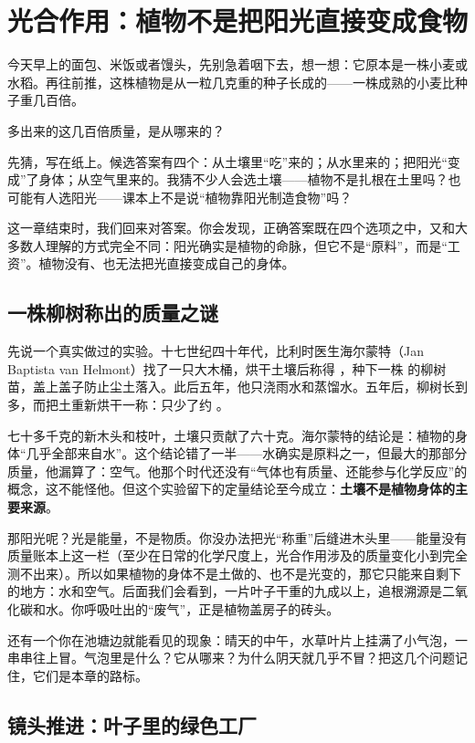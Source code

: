 \chapter{光合作用：植物不是把阳光直接变成食物}

\begin{kaichang}
今天早上的面包、米饭或者馒头，先别急着咽下去，想一想：它原本是一株小麦或水稻。再往前推，这株植物是从一粒几克重的种子长成的——一株成熟的小麦比种子重几百倍。

多出来的这几百倍质量，是从哪来的？

先猜，写在纸上。候选答案有四个：从土壤里“吃”来的；从水里来的；把阳光“变成”了身体；从空气里来的。我猜不少人会选土壤——植物不是扎根在土里吗？也可能有人选阳光——课本上不是说“植物靠阳光制造食物”吗？

这一章结束时，我们回来对答案。你会发现，正确答案既在四个选项之中，又和大多数人理解的方式完全不同：阳光确实是植物的命脉，但它不是“原料”，而是“工资”。植物没有、也无法把光直接变成自己的身体。
\end{kaichang}

\section{一株柳树称出的质量之谜}

先说一个真实做过的实验。十七世纪四十年代，比利时医生海尔蒙特（Jan Baptista van Helmont）找了一只大木桶，烘干土壤后称得 ，种下一株  的柳树苗，盖上盖子防止尘土落入。此后五年，他只浇雨水和蒸馏水。五年后，柳树长到  多，而把土重新烘干一称：只少了约 。

七十多千克的新木头和枝叶，土壤只贡献了六十克。海尔蒙特的结论是：植物的身体“几乎全部来自水”。这个结论错了一半——水确实是原料之一，但最大的那部分质量，他漏算了：空气。他那个时代还没有“气体也有质量、还能参与化学反应”的概念，这不能怪他。但这个实验留下的定量结论至今成立：\textbf{土壤不是植物身体的主要来源}。

那阳光呢？光是能量，不是物质。你没办法把光“称重”后缝进木头里——能量没有质量账本上这一栏（至少在日常的化学尺度上，光合作用涉及的质量变化小到完全测不出来）。所以如果植物的身体不是土做的、也不是光变的，那它只能来自剩下的地方：水和空气。后面我们会看到，一片叶子干重的九成以上，追根溯源是二氧化碳和水。你呼吸吐出的“废气”，正是植物盖房子的砖头。

还有一个你在池塘边就能看见的现象：晴天的中午，水草叶片上挂满了小气泡，一串串往上冒。气泡里是什么？它从哪来？为什么阴天就几乎不冒？把这几个问题记住，它们是本章的路标。

\section{镜头推进：叶子里的绿色工厂}

